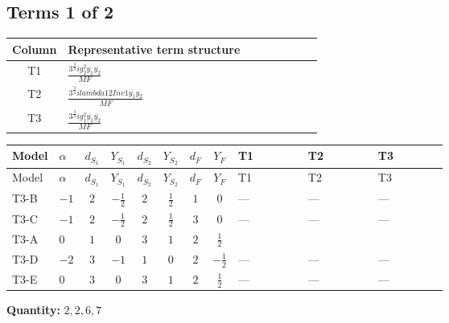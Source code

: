 \documentclass[8pt]{article}
\begin{document}
\begin{landscape}
\subsection*{Terms 1 of 2}
\begin{center}
\begin{tabular}{@{}c >{\raggedright\arraybackslash}p{0.82\linewidth}@{}}
\toprule
Column & Representative term structure \\
\midrule
T1 & \(\displaystyle \frac{3^{\frac{3}{4}} i g_{2}^{2} \overline{y_{1}} \overline{y_{2}}}{MF}\) \\
\midrule
T2 & \(\displaystyle \frac{3^{\frac{3}{4}} i lambda12Inv1 \overline{y_{1}} \overline{y_{2}}}{MF}\) \\
\midrule
T3 & \(\displaystyle \frac{3^{\frac{3}{4}} i g_{1}^{2} \overline{y_{1}} \overline{y_{2}}}{MF}\) \\
\midrule
\bottomrule
\end{tabular}
\end{center}
\smallskip
\tiny
\begin{longtable}{@{}llcccccc >{\raggedright\arraybackslash}p{0.21\linewidth} >{\raggedright\arraybackslash}p{0.21\linewidth} >{\raggedright\arraybackslash}p{0.21\linewidth}@{}}
\toprule
Model & $\alpha$ & $d_{S_1}$ & $Y_{S_1}$ & $d_{S_2}$ & $Y_{S_2}$ & $d_F$ & $Y_F$ & T1 & T2 & T3 \\
\midrule
\endfirsthead
\toprule
Model & $\alpha$ & $d_{S_1}$ & $Y_{S_1}$ & $d_{S_2}$ & $Y_{S_2}$ & $d_F$ & $Y_F$ & T1 & T2 & T3 \\
\midrule
\endhead
T3-B & $-1$ & $2$ & $-\frac{1}{2}$ & $2$ & $\frac{1}{2}$ & $1$ & $0$ & --- & --- & --- \\
\midrule
T3-C & $-1$ & $2$ & $-\frac{1}{2}$ & $2$ & $\frac{1}{2}$ & $3$ & $0$ & --- & --- & --- \\
\midrule
T3-A & $0$ & $1$ & $0$ & $3$ & $1$ & $2$ & $\frac{1}{2}$ & \scriptsize\adjustbox{max width=\linewidth}{$\begin{gathered} - \frac{17 \cdot 3^{\frac{3}{4}} i g_{2}^{2} \overline{y_{1}} \overline{y_{2}}}{24 MF}\end{gathered}$} & \scriptsize\adjustbox{max width=\linewidth}{$\begin{gathered} - \frac{3^{\frac{3}{4}} i lambda12Inv1 \overline{y_{1}} \overline{y_{2}}}{6 MF}\end{gathered}$} & \scriptsize\adjustbox{max width=\linewidth}{$\begin{gathered} - \frac{3^{\frac{3}{4}} i g_{1}^{2} \overline{y_{1}} \overline{y_{2}}}{8 MF}\end{gathered}$} \\
\midrule
T3-D & $-2$ & $3$ & $-1$ & $1$ & $0$ & $2$ & $-\frac{1}{2}$ & --- & --- & --- \\
\midrule
T3-E & $0$ & $3$ & $0$ & $3$ & $1$ & $2$ & $\frac{1}{2}$ & --- & --- & --- \\
\midrule
\bottomrule
\end{longtable}
\clearpage
\noindent\textbf{Quantity: }$\mathrm{2,2,6,7}$\par\smallskip

\end{landscape}
\end{document}
